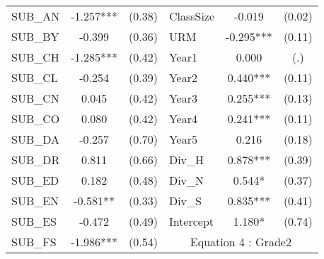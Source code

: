 \begin{table}[H]
\begin{threeparttable}
\begin{tabular}{l c c|l c c }
    SUB\_AN                                      & -1.257***                  & (0.38)               & ClassSize           & -0.019                 & (0.02)               \\
    SUB\_BY                                      & -0.399                     & (0.36)               & URM                 & -0.295***              & (0.11)               \\
    SUB\_CH                                      & -1.285***                  & (0.42)               & Year1               & 0.000                  & (.)                  \\
    SUB\_CL                                      & -0.254                     & (0.39)               & Year2               & 0.440***               & (0.11)               \\
    SUB\_CN                                      & 0.045                      & (0.42)               & Year3               & 0.255***               & (0.13)               \\
    SUB\_CO                                      & 0.080                      & (0.42)               & Year4               & 0.241***               & (0.11)               \\
    SUB\_DA                                      & -0.257                     & (0.70)               & Year5               & 0.216                  & (0.18)               \\
    SUB\_DR                                      & 0.811                      & (0.66)               & Div\_H              & 0.878***               & (0.39)               \\
    SUB\_ED                                      & 0.182                      & (0.48)               & Div\_N              & 0.544*                 & (0.37)               \\
    SUB\_EN                                      & -0.581**                   & (0.33)               & Div\_S              & 0.835***               & (0.41)               \\
    SUB\_ES                                      & -0.472                     & (0.49)               & Intercept           & 1.180*                 & (0.74)               \\
    \cline{4-6}
    SUB\_FS                                      & -1.986***                  & (0.54)               & \multicolumn{3}{c}{Equation 4 : Grade2}                             \\
    \cline{4-6}

\end{tabular}
\end{threeparttable}
\end{table}
